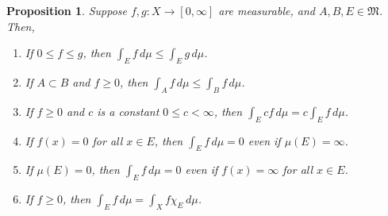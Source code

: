 \documentclass[11pt]{book}
\newtheorem{proposition}{Proposition}[chapter]
\theoremstyle{definition}
\numberwithin{equation}{chapter}
\begin{document}
\medskip

\begin{proposition}
Suppose $f,g:X \to [0,\infty]$ are measurable, and $A,B,E \in \mathfrak{M}$. Then,
\begin{enumerate}[label=(\alph*)]
    \item If $0 \leq f \leq g$, then $\int_E f\,d\mu \leq \int_E g\,d\mu$.
    
    \item If $A\subset B$ and $f \geq 0$, then $\int_A f\,d\mu \leq \int_B f\,d\mu$.
    
    \item If $f \geq 0$ and $c$ is a constant $0 \leq c < \infty$, then $\int_E cf\,d\mu = c \int_E f\,d\mu$.
    
    \item If $f(x) = 0$ for all $x \in E$, then $\int_E f\,d\mu = 0$ even if $\mu(E) = \infty$.
    
    \item If $\mu(E) = 0$, then $\int_E f\,d\mu = 0$ even if $f(x) = \infty$ for all $x\in E$.
    
    \item If $f \geq 0$, then $\int_E f\,d\mu = \int_X f \chi_E \,d\mu$.
\end{enumerate}
\end{proposition}

\medskip
\end{document}
